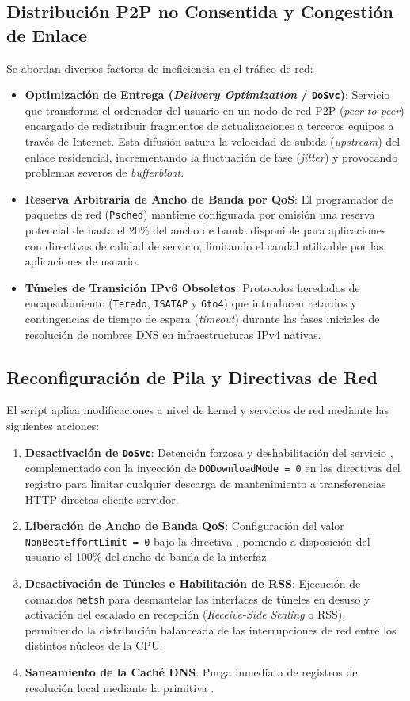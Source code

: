 \documentclass[12pt,a4paper]{report}
\begin{document}
\subsection{Distribución P2P no Consentida y Congestión de Enlace}
Se abordan diversos factores de ineficiencia en el tráfico de red:
\begin{itemize}
    \item \textbf{Optimización de Entrega (\textit{Delivery Optimization} / \texttt{DoSvc})}: Servicio que transforma el ordenador del usuario en un nodo de red P2P (\textit{peer-to-peer}) encargado de redistribuir fragmentos de actualizaciones a terceros equipos a través de Internet. Esta difusión satura la velocidad de subida (\textit{upstream}) del enlace residencial, incrementando la fluctuación de fase (\textit{jitter}) y provocando problemas severos de \textit{bufferbloat}.
    \item \textbf{Reserva Arbitraria de Ancho de Banda por QoS}: El programador de paquetes de red (\texttt{Psched}) mantiene configurada por omisión una reserva potencial de hasta el 20\% del ancho de banda disponible para aplicaciones con directivas de calidad de servicio, limitando el caudal utilizable por las aplicaciones de usuario.
    \item \textbf{Túneles de Transición IPv6 Obsoletos}: Protocolos heredados de encapsulamiento (\texttt{Teredo}, \texttt{ISATAP} y \texttt{6to4}) que introducen retardos y contingencias de tiempo de espera (\textit{timeout}) durante las fases iniciales de resolución de nombres DNS en infraestructuras IPv4 nativas.
\end{itemize}

\subsection{Reconfiguración de Pila y Directivas de Red}
El script aplica modificaciones a nivel de kernel y servicios de red mediante las siguientes acciones:
\begin{enumerate}
    \item \textbf{Desactivación de \texttt{DoSvc}}: Detención forzosa y deshabilitación del servicio , complementado con la inyección de \texttt{DODownloadMode = 0} en las directivas del registro para limitar cualquier descarga de mantenimiento a transferencias HTTP directas cliente-servidor.
    \item \textbf{Liberación de Ancho de Banda QoS}: Configuración del valor \texttt{NonBestEffortLimit = 0} bajo la directiva , poniendo a disposición del usuario el 100\% del ancho de banda de la interfaz.
    \item \textbf{Desactivación de Túneles e Habilitación de RSS}: Ejecución de comandos \texttt{netsh} para desmantelar las interfaces de túneles en desuso y activación del escalado en recepción (\textit{Receive-Side Scaling} o RSS), permitiendo la distribución balanceada de las interrupciones de red entre los distintos núcleos de la CPU.
    \item \textbf{Saneamiento de la Caché DNS}: Purga inmediata de registros de resolución local mediante la primitiva .
\end{enumerate}
\end{document}
